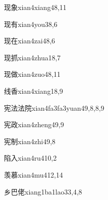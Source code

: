 \begin{entry}{现象}{xian4xiang4}{8,11}
\end{entry}

\begin{entry}{现有}{xian4you3}{8,6}
\end{entry}

\begin{entry}{现在}{xian4zai4}{8,6}
\end{entry}

\begin{entry}{现抓}{xian4zhua1}{8,7}
\end{entry}

\begin{entry}{现做}{xian4zuo4}{8,11}
\end{entry}

\begin{entry}{线香}{xian4xiang1}{8,9}
\end{entry}

\begin{entry}{宪法法院}{xian4fa3fa3yuan4}{9,8,8,9}
\end{entry}

\begin{entry}{宪政}{xian4zheng4}{9,9}
\end{entry}

\begin{entry}{宪制}{xian4zhi4}{9,8}
\end{entry}

\begin{entry}{陷入}{xian4ru4}{10,2}
\end{entry}

\begin{entry}{羡慕}{xian4mu4}{12,14}
\end{entry}

\begin{entry}{乡巴佬}{xiang1ba1lao3}{3,4,8}
\end{entry}

